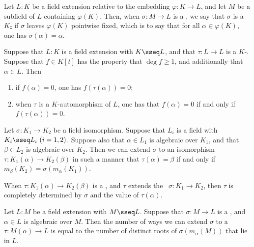 \documentclass{article}
\begin{document}
  \begin{tdefinition}[\( F \)-\homo]
    Let \(L : K\) be a field extension relative to the embedding \(\varphi : K \to L\), and let \(M\) be a subfield of \(L\) containing \(\varphi(K)\).
    Then, when \(\sigma : M \to L\) is a \homo , we say that \(\sigma\) is a \ul{\(K\)-\homo} if \(\sigma\) leaves \(\varphi(K)\) pointwise fixed, which is to say that for all \(\alpha \in \varphi(K)\), one has \( \sigma(\alpha) = \alpha \).
  \end{tdefinition}

  \begin{tproposition}
    Suppose that \( L:K \) is a field extension with \( K\sseq L \), and that \( \tau:L\to L \) is a \( K \)-\homo .
    Suppose that \( f\in K[t] \) has the property that \( \deg f \geq 1 \), and additionally that \( \alpha\in L \).
    Then \begin{enumerate}[label=(\roman*)]
      \item if \( f(\alpha) = 0 \), one has \( f(\tau(\alpha)) = 0 \);
      \item when \( \tau \) is a \( K \)-automorphism of \( L \), one has that \( f(\alpha) = 0 \) if and only if \( f(\tau(\alpha)) = 0 \).
    \end{enumerate}
  \end{tproposition}

  \begin{ttheorem}
    Let \( \sigma :K_1\to K_2 \) be a field isomorphism.
    Suppose that \( L_i \) is a field with \( K_i\sseq L_i\ (i=1,2) \).
    Suppose also that \( \alpha\in L_1 \) is algebraic over \( K_1 \), and that \( \beta\in L_2 \) is algebraic over \( K_2 \).
    Then we can extend \( \sigma \) to an isomorphism \( \tau:K_1(\alpha)\to K_2(\beta) \) in such a manner that \( \tau(\alpha) = \beta \) if and only if \( m_\beta(K_2) = \sigma(m_\alpha(K_1)) \).
  \end{ttheorem}

  \quad When \( \tau:K_1(\alpha)\to K_2(\beta) \) is a \homo, and \( \tau \) extends the \homo~\( \sigma:K_1\to K_2 \), then \( \tau \) is completely determined by \( \sigma \) and the value of \( \tau(\alpha) \).

  \begin{tcorollary}
    Let \( L:M \) be a field extension with \( M\sseq L \).
    Suppose that \( \sigma:M\to L \) is a \homo, and \( \alpha\in L \) is algebraic over \( M \).
    Then the number of ways we can extend \( \sigma \) to a \homo~\( \tau:M(\alpha)\to L \) is equal to the number of distinct roots of \( \sigma(m_\alpha(M)) \) that lie in \( L \).
  \end{tcorollary}
\end{document}
